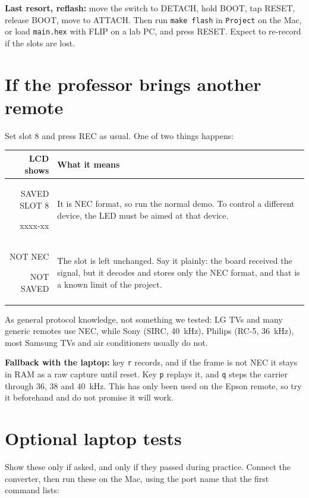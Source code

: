 \documentclass[11pt,a4paper]{article}
\newcommand{\code}[1]{\texttt{#1}}
\newcommand{\lcd}[2]{{\setlength{\fboxsep}{2.5pt}\colorbox{lcdbg}{\parbox{2.25cm}{\raggedright\ttfamily\scriptsize\strut #1\\\strut #2}}}}
\begin{document}
\textbf{Last resort, reflash:} move the switch to DETACH, hold BOOT, tap RESET, release BOOT, move to ATTACH. Then run \code{make flash} in \code{Project} on the Mac, or load \code{main.hex} with FLIP on a lab PC, and press RESET. Expect to re-record if the slots are lost.

\newpage
\section{If the professor brings another remote}
\label{sec:other}

Set slot 8 and press REC as usual. One of two things happens:

\begin{center}
\small
\begin{tabularx}{\textwidth}{@{}D L@{}}
\toprule
LCD shows & What it means\\
\midrule
\lcd{SAVED SLOT 8}{xxxx-xx} & It is NEC format, so run the normal demo. To control a different device, the LED must be aimed at that device.\\
\addlinespace
\lcd{NOT NEC}{NOT SAVED} & The slot is left unchanged. Say it plainly: the board received the signal, but it decodes and stores only the NEC format, and that is a known limit of the project.\\
\bottomrule
\end{tabularx}
\end{center}

As general protocol knowledge, not something we tested: LG TVs and many generic remotes use NEC, while Sony (SIRC, \qty{40}{\kilo\hertz}), Philips (RC-5, \qty{36}{\kilo\hertz}), most Samsung TVs and air conditioners usually do not.

\textbf{Fallback with the laptop:} key \code{r} records, and if the frame is not NEC it stays in RAM as a raw capture until reset. Key \code{p} replays it, and \code{q} steps the carrier through 36, 38 and \qty{40}{\kilo\hertz}. This has only been used on the Epson remote, so try it beforehand and do not promise it will work.

\section{Optional laptop tests}
\label{sec:laptop}

Show these only if asked, and only if they passed during practice. Connect the converter, then run these on the Mac, using the port name that the first command lists:
\end{document}
